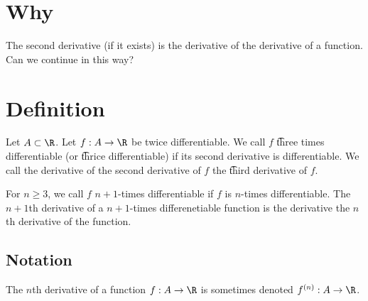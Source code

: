 
\section*{Why}

The second derivative (if it exists) is the derivative of the derivative of a function.
Can we continue in this way?

\section*{Definition}

Let $A \subset \R $.
Let $f: A \to \R $ be twice differentiable.
We call $f$ \t{three times differentiable} (or \t{thrice differentiable}) if its second derivative is differentiable.
We call the derivative of the second derivative of $f$ the \t{third derivative} of $f$.

For $n \geq 3$, we call $f$ \t{$n+1$-times differentiable} if $f$ is $n$-times differentiable.
The \t{$n+1$th derivative} of a $n+1$-times differenetiable function is the derivative the $n$th derivative of the function.

\subsection*{Notation}

The $n$th derivative of a function $f: A \to \R $ is sometimes denoted $f^{(n)}: A \to \R $.

\blankpage